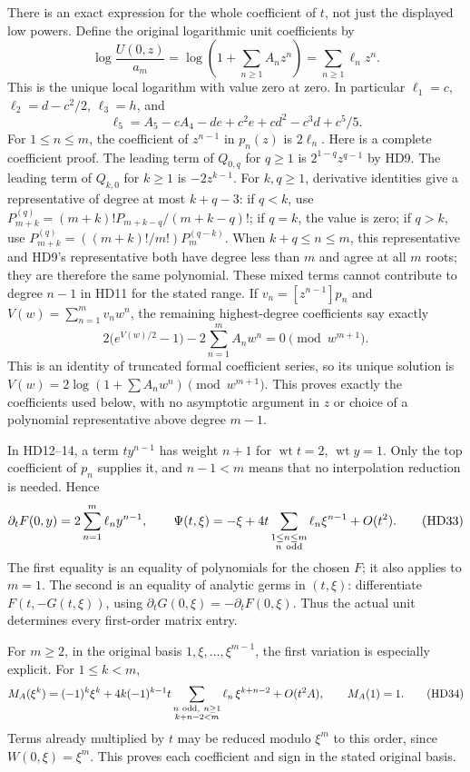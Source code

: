 There is an exact expression for the whole coefficient of $t$,
not just the displayed low powers. Define the original logarithmic
unit coefficients by
\[
 \log\frac{U(0,z)}{a_m}
       =\log\left(1+\sum_{n\ge1}A_nz^n\right)
       =\sum_{n\ge1}\ell_nz^n .
 \tag{HD30}\label{hd:logunit}
\]
This is the unique local logarithm with value zero at zero.
In particular $\ell_1=c$, $\ell_2=d-c^2/2$, $\ell_3=h$, and
\[
 \ell_5=A_5-cA_4-d e+c^2e+cd^2-c^3d+c^5/5.
 \tag{HD31}
\]
For $1\le n\le m$, the coefficient of $z^{n-1}$ in $p_n(z)$
is $2\ell_n$.
Here is a complete coefficient proof. The leading term of
$Q_{0,q}$ for $q\ge1$ is $2^{1-q}z^{q-1}$ by HD9.
The leading term of $Q_{k,0}$ for $k\ge1$ is $-2z^{k-1}$.
For $k,q\ge1$, derivative identities give a representative of degree
at most $k+q-3$: if $q<k$, use
$P_{m+k}^{(q)}=(m+k)!P_{m+k-q}/(m+k-q)!$;
if $q=k$, the value is zero; if $q>k$, use
$P_{m+k}^{(q)}=((m+k)!/m!)P_m^{(q-k)}$.
When $k+q\le n\le m$, this representative and HD9's representative
both have degree less than $m$ and agree at all $m$ roots;
they are therefore the same polynomial. These mixed terms cannot
contribute to degree $n-1$ in HD11 for the stated range.
If $v_n=[z^{n-1}]p_n$ and $V(w)=\sum_{n=1}^m v_nw^n$,
the remaining highest-degree coefficients say exactly
\[
 2\bigl(e^{V(w)/2}-1\bigr)-2\sum_{n=1}^m A_nw^n
          =0\pmod{w^{m+1}}.
 \tag{HD32}
\]
This is an identity of truncated formal coefficient series, so its
unique solution is
$V(w)=2\log(1+\sum A_nw^n)\pmod{w^{m+1}}$.
This proves exactly the coefficients used below, with no
asymptotic argument in $z$ or choice of a polynomial representative
above degree $m-1$.

In HD12--14, a term $t y^{n-1}$ has weight $n+1$ for
$\operatorname{wt}t=2$, $\operatorname{wt}y=1$.
Only the top coefficient of $p_n$ supplies it, and $n-1<m$
means that no interpolation reduction is needed. Hence
\[
 \partial_t F(0,y)=2\sum_{n=1}^m\ell_n y^{n-1},\qquad
 \Psi(t,\xi)=-\xi+
       4t\sum_{\substack{1\le n\le m\\ n\ {\rm odd}}}
                         \ell_n\xi^{n-1}+O(t^2).
 \tag{HD33}\label{hd:firstvariation}
\]
The first equality is an equality of polynomials for the chosen
$F$; it also applies to $m=1$.
The second is an equality of analytic germs in $(t,\xi)$:
differentiate $F(t,-G(t,\xi))$, using
$\partial_tG(0,\xi)=-\partial_tF(0,\xi)$.
Thus the actual unit determines every first-order matrix entry.

For $m\ge2$, in the original basis $1,\xi,\ldots,\xi^{m-1}$,
the first variation is especially explicit. For $1\le k<m$,
\[
 M_A(\xi^k)=(-1)^k\xi^k+
 4k(-1)^{k-1}t
   \sum_{\substack{n\ {\rm odd},\ n\ge1\\k+n-2<m}}
                 \ell_n\,\xi^{k+n-2}+O(t^2A),
 \qquad M_A(1)=1 .
 \tag{HD34}\label{hd:matrixvariation}
\]
Terms already multiplied by $t$ may be reduced modulo $\xi^m$
to this order, since $W(0,\xi)=\xi^m$.
This proves each coefficient and sign in the stated original basis.

